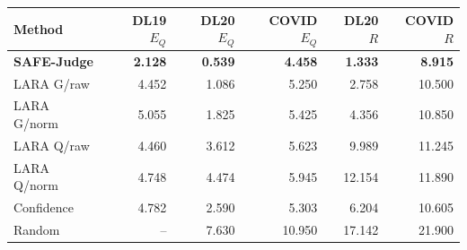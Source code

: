 \begin{tabular}{@{}lrrrrr@{}}
\toprule
Method & DL19 $E_Q$ & DL20 $E_Q$ & COVID $E_Q$ & DL20 $R$ & COVID $R$ \\
\midrule
\textbf{SAFE-Judge} & \textbf{2.128} & \textbf{0.539} & \textbf{4.458} & \textbf{1.333} & \textbf{8.915} \\
LARA G/raw & 4.452 & 1.086 & 5.250 & 2.758 & 10.500 \\
LARA G/norm & 5.055 & 1.825 & 5.425 & 4.356 & 10.850 \\
LARA Q/raw & 4.460 & 3.612 & 5.623 & 9.989 & 11.245 \\
LARA Q/norm & 4.748 & 4.474 & 5.945 & 12.154 & 11.890 \\
Confidence & 4.782 & 2.590 & 5.303 & 6.204 & 10.605 \\
Random & -- & 7.630 & 10.950 & 17.142 & 21.900 \\
\bottomrule
\end{tabular}
